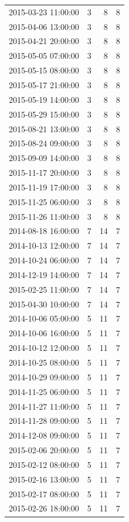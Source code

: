 \begin{tabular}{lrrr}
2015-03-23 11:00:00 & 3 & 8 & 8 \\
2015-04-06 13:00:00 & 3 & 8 & 8 \\
2015-04-21 20:00:00 & 3 & 8 & 8 \\
2015-05-05 07:00:00 & 3 & 8 & 8 \\
2015-05-15 08:00:00 & 3 & 8 & 8 \\
2015-05-17 21:00:00 & 3 & 8 & 8 \\
2015-05-19 14:00:00 & 3 & 8 & 8 \\
2015-05-29 15:00:00 & 3 & 8 & 8 \\
2015-08-21 13:00:00 & 3 & 8 & 8 \\
2015-08-24 09:00:00 & 3 & 8 & 8 \\
2015-09-09 14:00:00 & 3 & 8 & 8 \\
2015-11-17 20:00:00 & 3 & 8 & 8 \\
2015-11-19 17:00:00 & 3 & 8 & 8 \\
2015-11-25 06:00:00 & 3 & 8 & 8 \\
2015-11-26 11:00:00 & 3 & 8 & 8 \\
2014-08-18 16:00:00 & 7 & 14 & 7 \\
2014-10-13 12:00:00 & 7 & 14 & 7 \\
2014-10-24 06:00:00 & 7 & 14 & 7 \\
2014-12-19 14:00:00 & 7 & 14 & 7 \\
2015-02-25 11:00:00 & 7 & 14 & 7 \\
2015-04-30 10:00:00 & 7 & 14 & 7 \\
2014-10-06 05:00:00 & 5 & 11 & 7 \\
2014-10-06 16:00:00 & 5 & 11 & 7 \\
2014-10-12 12:00:00 & 5 & 11 & 7 \\
2014-10-25 08:00:00 & 5 & 11 & 7 \\
2014-10-29 09:00:00 & 5 & 11 & 7 \\
2014-11-25 06:00:00 & 5 & 11 & 7 \\
2014-11-27 11:00:00 & 5 & 11 & 7 \\
2014-11-28 09:00:00 & 5 & 11 & 7 \\
2014-12-08 09:00:00 & 5 & 11 & 7 \\
2015-02-06 20:00:00 & 5 & 11 & 7 \\
2015-02-12 08:00:00 & 5 & 11 & 7 \\
2015-02-16 13:00:00 & 5 & 11 & 7 \\
2015-02-17 08:00:00 & 5 & 11 & 7 \\
2015-02-26 18:00:00 & 5 & 11 & 7 \\

\end{tabular}
